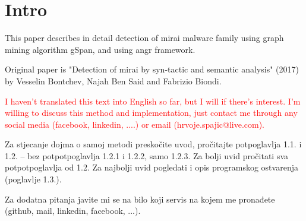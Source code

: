 \documentclass[times, utf8, numeric]{fer}
\begin{document}
\lstset{
    language=C,
    tabsize=2, 
    basicstyle=\scriptsize,
    showstringspaces=false,
    frame = single,
    aboveskip=2em,
    belowskip=2em,
    numbers=left,
    xleftmargin=2em,
    breaklines=true,
    captionpos=b
}
\renewcommand{\lstlistingname}{Programski kod}

\def\inlinecode{\lstinline[basicstyle=\footnotesize]}

\setcounter{chapter}{-1}
\chapter{Intro}

This paper describes in detail detection of mirai malware family using graph mining algorithm gSpan,
and using angr framework.

Original paper is "Detection of mirai by syn-tactic and semantic analysis" (2017) by
Vesselin Bontchev, Najah Ben Said and Fabrizio Biondi.

\textcolor{red}{I haven't translated this text into English so far, but I will if there's interest.  I'm willing to discuss this method and implementation, just contact me through any social media (facebook, linkedin, ....) or email (hrvoje.spajic@live.com).}

Za stjecanje dojma o samoj metodi preskočite uvod, pročitajte potpoglavlja 1.1. i 1.2. -- bez potpotpoglavlja 1.2.1 i 1.2.2, samo 1.2.3. Za bolji uvid pročitati sva potpotpoglavlja od 1.2. Za najbolji uvid pogledati i opis programskog ostvarenja (poglavlje 1.3.). 

Za dodatna pitanja javite mi se na bilo koji servis na kojem me pronađete (github, mail, linkedin, facebook, ...). 






\end{document}
